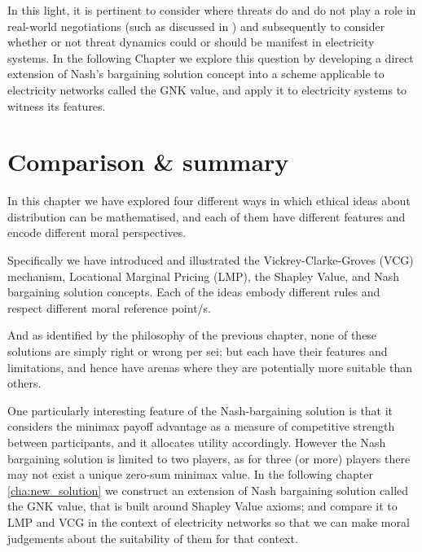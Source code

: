 In this light, it is pertinent to consider where threats do and do not play a role in real-world negotiations (such as discussed in \cite{anbarci2002comparing}) and subsequently to consider whether or not threat dynamics could or should be manifest in electricity systems.
In the following Chapter we explore this question by developing a direct extension of Nash's bargaining solution concept into a scheme applicable to electricity networks called the GNK value, and apply it to electricity systems to witness its features.%




\section{Comparison \& summary}

In this chapter we have explored four different ways in which ethical ideas about distribution can be mathematised, and each of them have different features and encode different moral perspectives.

Specifically we have introduced and illustrated the Vickrey-Clarke-Groves (VCG) mechanism, Locational Marginal Pricing (LMP), the Shapley Value, and Nash bargaining solution concepts.
Each of the ideas embody different rules and respect different moral reference point/s.

And as identified by the philosophy of the previous chapter, none of these solutions are simply right or wrong per sei; but each have their features and limitations, and hence have arenas where they are potentially more suitable than others.

One particularly interesting feature of the Nash-bargaining solution is that it considers the minimax payoff advantage as a measure of competitive strength between participants, and it allocates utility accordingly.
However the Nash bargaining solution is limited to two players, as for three (or more) players there may not exist a unique zero-sum minimax value.
In the following chapter \ref{cha:new_solution} we construct an extension of Nash bargaining solution called the GNK value, that is built around Shapley Value axioms; and compare it to LMP and VCG in the context of electricity networks so that we can make moral judgements about the suitability of them for that context.




